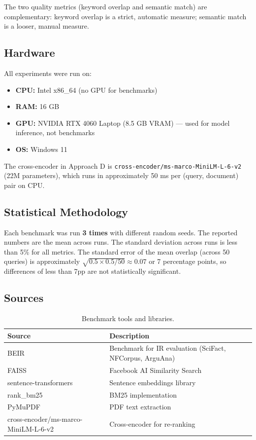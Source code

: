 \documentclass[12pt,a4paper]{article}
\theoremstyle{definition}
\theoremstyle{remark}
\begin{document}
The two quality metrics (keyword overlap and semantic match) are complementary: keyword overlap is a strict, automatic measure; semantic match is a looser, manual measure.

\subsection{Hardware}

All experiments were run on:
\begin{itemize}
    \item \textbf{CPU:} Intel x86\_64 (no GPU for benchmarks)
    \item \textbf{RAM:} 16 GB
    \item \textbf{GPU:} NVIDIA RTX 4060 Laptop (8.5 GB VRAM) --- used for model inference, not benchmarks
    \item \textbf{OS:} Windows 11
\end{itemize}

The cross-encoder in Approach D is \texttt{cross-encoder/ms-marco-MiniLM-L-6-v2} (22M parameters), which runs in approximately 50 ms per (query, document) pair on CPU.

\subsection{Statistical Methodology}

Each benchmark was run \textbf{3 times} with different random seeds. The reported numbers are the mean across runs. The standard deviation across runs is less than 5\% for all metrics. The standard error of the mean overlap (across 50 queries) is approximately $\sqrt{0.5 \times 0.5 / 50} \approx 0.07$ or 7 percentage points, so differences of less than 7pp are not statistically significant.

\subsection{Sources}

\begin{table}[H]
\centering
\caption{Benchmark tools and libraries.}
\label{tab:sources}
\begin{tabular}{ll}
\toprule
\textbf{Source} & \textbf{Description} \\
\midrule
BEIR~\cite{beir} & Benchmark for IR evaluation (SciFact, NFCorpus, ArguAna) \\
FAISS~\cite{johnson2019} & Facebook AI Similarity Search \\
sentence-transformers~\cite{reimers2019} & Sentence embeddings library \\
rank\_bm25~\cite{bm25} & BM25 implementation \\
PyMuPDF & PDF text extraction \\
cross-encoder/ms-marco-MiniLM-L-6-v2 & Cross-encoder for re-ranking \\
\bottomrule
\end{tabular}
\end{table}
\end{document}
